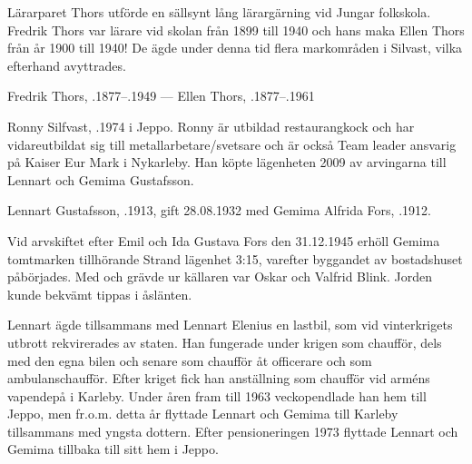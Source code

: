 Lärarparet Thors utförde en sällsynt lång lärargärning vid Jungar	folkskola. Fredrik Thors var lärare vid skolan från 1899 till 1940 och hans maka Ellen Thors från år 1900 till 1940! De ägde under denna tid flera markområden i Silvast, vilka efterhand avyttrades.

Fredrik Thors, .1877--.1949  ---  Ellen Thors, .1877--.1961



%



%
Ronny Silfvast, .1974 i Jeppo. Ronny är utbildad restaurangkock och har vidareutbildat sig till metallarbetare/svetsare och är också Team leader ansvarig på Kaiser Eur Mark i Nykarleby. Han köpte lägenheten 2009 av arvingarna till Lennart och Gemima Gustafsson.


%
Lennart Gustafsson, .1913, gift 28.08.1932 med Gemima Alfrida Fors, .1912.
\begin{jhchildren}
  \item {}
  \item {}
  \item {}
  \item {}
  \item {}
\end{jhchildren}
Vid arvskiftet efter Emil och Ida Gustava Fors den 31.12.1945 erhöll Gemima tomtmarken tillhörande Strand lägenhet 3:15, varefter byggandet av bostadshuset påbörjades. Med och grävde ur källaren var Oskar och Valfrid Blink. Jorden kunde bekvämt tippas i åslänten.

Lennart ägde tillsammans med Lennart Elenius en lastbil, som vid vinterkrigets utbrott rekvirerades av staten. Han fungerade under krigen som chaufför, dels med den egna bilen och senare som chaufför åt officerare och som ambulanschaufför. Efter kriget fick han anställning som chaufför vid arméns vapendepå i Karleby. Under åren fram till 1963 veckopendlade han hem till Jeppo, men fr.o.m. detta år flyttade Lennart och Gemima till Karleby tillsammans med yngsta dottern. Efter pensioneringen 1973 flyttade Lennart och Gemima tillbaka till sitt hem i Jeppo.

